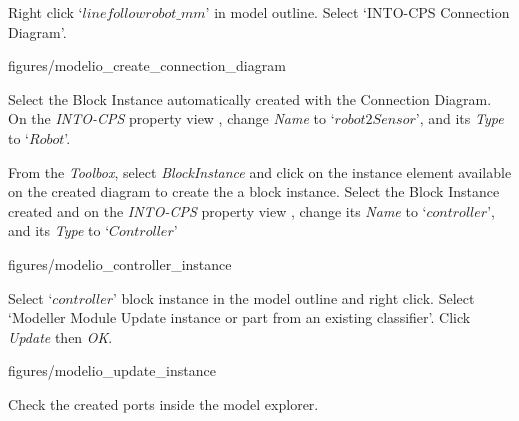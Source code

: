 \documentclass[11pt,a4paper]{../tutorial}
\begin{document}
\begin{instructions}

\item Right click `$linefollowrobot\_mm$' in model outline. Select `INTO-CPS \menusep Connection Diagram'.

\begin{center}
\begin{annotation}[width=0.7\linewidth]{figures/modelio_create_connection_diagram}
    \end{annotation}
\end{center}

\item Select the Block Instance automatically created with the Connection Diagram. On the \emph{INTO-CPS} property view , change \emph{Name} to `$robot2Sensor$', and its \emph{Type} to `$Robot$'.

\item \label{start-instanciation} From the \emph{Toolbox}, select \emph{BlockInstance} and click on the instance element  available on the created diagram to create the a block instance. Select the Block Instance  created and on the \emph{INTO-CPS} property view , change its \emph{Name} to `$controller$', and its \emph{Type} to `$Controller$'

\begin{center}
\begin{annotation}[width=0.7\linewidth]{figures/modelio_controller_instance}
    \end{annotation}
\end{center}

\item Select `$controller$' block instance in the model outline and right click. Select `Modeller Module \menusep Update instance or part from an existing classifier'. Click \emph{Update} then \emph{OK}.

\begin{center}
\begin{annotation}[width=0.7\linewidth]{figures/modelio_update_instance}
    \end{annotation}
\end{center}

\item Check the created ports inside the model explorer.


\end{instructions}
\end{document}
